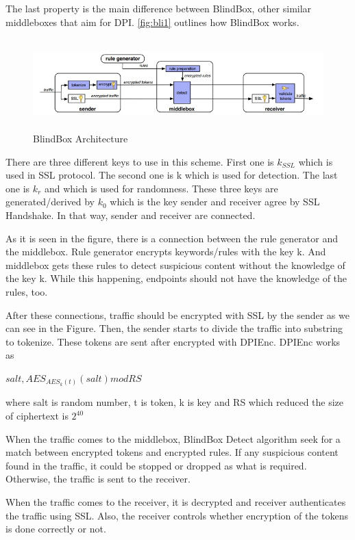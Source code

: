 \documentclass{winslabreport}
\begin{document}
The last property is the main difference between BlindBox, other similar middleboxes that aim for DPI. \autoref{fig:bli1} outlines how BlindBox works.

\begin{figure}[H]
	\centering
	\includegraphics[width=150mm,height=35mm]{blindbox.jpg}
	\caption{BlindBox Architecture}
	\label{fig:bli1}
\end{figure}

There are three different keys to use in this scheme. First one is $k_{SSL}$ which is used in SSL protocol. The second one is k which is used for detection. The last one is $k_r$ and which is used for randomness. These three keys are generated/derived by $k_0$ which is the key sender and receiver agree by SSL Handshake. In that way, sender and receiver are connected.

As it is seen in the figure, there is a connection between the rule generator and the middlebox. Rule generator encrypts keywords/rules with the key k. And middlebox gets these rules to detect suspicious content without the knowledge of the key k. While this happening, endpoints should not have the knowledge of the rules, too.

After these connections, traffic should be encrypted with SSL by the sender as we can see in the Figure. Then, the sender starts to divide the traffic into substring to tokenize. These tokens are sent after encrypted with DPIEnc. DPIEnc works as

\begin{center}
	$salt ,  AES_{AES_k (t)}(salt)  mod RS$
\end{center}

where salt is random number, t is token, k is key and  RS which reduced the size of ciphertext is $2^{40}$

When the traffic comes to the middlebox, BlindBox Detect algorithm seek for a match between encrypted tokens and encrypted rules. If any suspicious content found in the traffic, it could be stopped or dropped as what is required. Otherwise, the traffic is sent to the receiver.

When the traffic comes to the receiver, it is decrypted and receiver authenticates the traffic using SSL. Also, the receiver controls whether encryption of the tokens is done correctly or not. 
\end{document}
